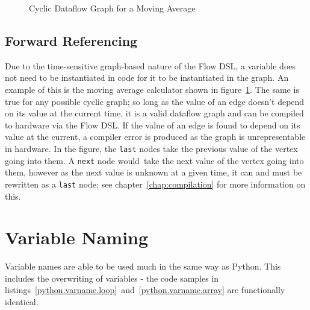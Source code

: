 \begin{figure}[H]
  \centering
  \caption{Cyclic Dataflow Graph for a Moving Average}\label{design.mvg_avg.total}
\end{figure}

\subsection{Forward Referencing}
Due to the time-sensitive graph-based nature of the Flow DSL, a variable does not need to be instantiated in code for it to be instantiated in the graph. An example of this is the moving average calculator shown in figure \ref{design.mvg_avg.total}. The same is true for any possible cyclic graph; so long as the value of an edge doesn't depend on its value at the current time, it is a valid dataflow graph and can be compiled to hardware via the Flow DSL. If the value of an edge is found to depend on its value at the current, a compiler error is produced as the graph is unrepresentable in hardware. In the figure, the \lstinline|last| nodes take the previous value of the vertex going into them. A \lstinline|next| node would take the next value of the vertex going into them, however as the next value is unknown at a given time, it can and must be rewritten as a \lstinline|last| node; see chapter \ref{chap:compilation} for more information on this.

\section{Variable Naming}
Variable names are able to be used much in the same way as Python. This includes the overwriting of variables \hyphen{} the code samples in listings \ref{python.varname.loop} and \ref{python.varname.array} are functionally identical.

